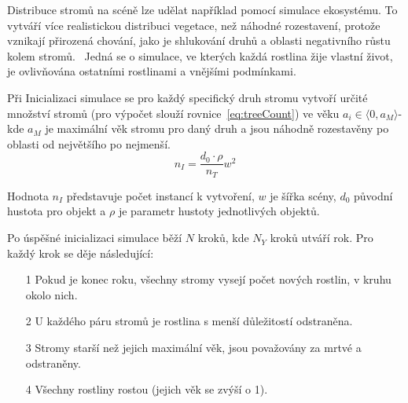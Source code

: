 Distribuce stromů na scéně lze udělat například pomocí simulace ekosystému. To vytváří více realistickou distribuci vegetace, než náhodné rozestavení, protože vznikají přirozená chování, jako je shlukování druhů a oblasti negativního růstu kolem stromů.~\cite{newlands2022procedural} Jedná se o simulace, ve kterých každá rostlina žije vlastní život, je ovlivňována ostatními rostlinami a vnějšími podmínkami.~\cite{Benes02ICCVG} 

Při Inicializaci simulace se pro každý specifický druh stromu vytvoří určité množství stromů (pro výpočet slouží rovnice~\ref{eq:treeCount}) ve věku $a_i\in\langle0,a_M\rangle$- kde $a_M$ je maximální věk stromu pro daný druh a jsou náhodně rozestavěny po oblasti od největšího po nejmenší.~\cite{newlands2022procedural}
\begin{equation}
\label{eq:treeCount} 
	n_I=\frac{d_0\cdot\rho}{n_T}w^2 
\end{equation}

Hodnota $n_I$ představuje počet instancí k vytvoření, $w$ je šířka scény, $d_0$ původní hustota pro objekt a $\rho$ je parametr hustoty jednotlivých objektů.

Po úspěšné inicializaci simulace běží $N$ kroků, kde $N_Y$ kroků utváří rok. Pro každý krok se děje následující:

\begin{itemize}
	\item[1] Pokud je konec roku, všechny stromy vysejí počet nových rostlin, v kruhu okolo nich.
	\item[2] U každého páru stromů je rostlina s menší důležitostí odstraněna.
	\item[3] Stromy starší než jejich maximální věk, jsou považovány za mrtvé a odstraněny.
	\item[4] Všechny rostliny rostou (jejich věk se zvýší o 1).
\end{itemize}


